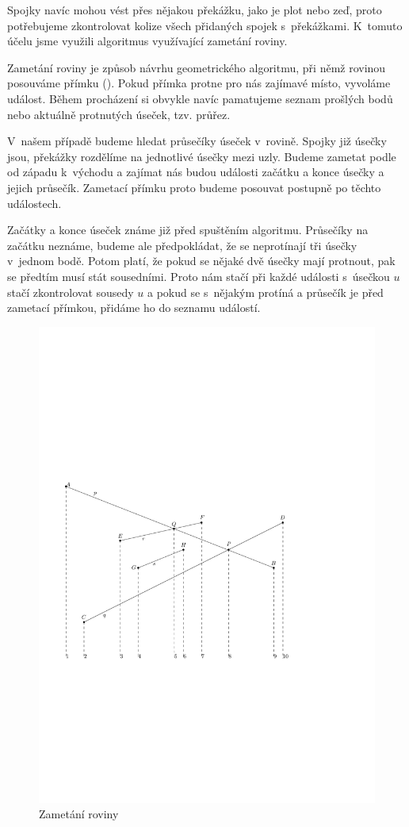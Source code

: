 Spojky navíc mohou vést přes nějakou překážku, jako je plot nebo zeď, proto
potřebujeme zkontrolovat kolize všech přidaných spojek s~překážkami. K~tomuto
účelu jsme využili algoritmus využívající zametání roviny.


{\tuc Zametání roviny} \cite{zametani} je způsob návrhu geometrického algoritmu,
při němž rovinou posouváme přímku (). Pokud přímka protne pro nás
zajímavé místo, vyvoláme událost. Během procházení si obvykle navíc pamatujeme
seznam prošlých bodů nebo aktuálně protnutých úseček, tzv. {\tuc průřez}.

V~našem případě budeme hledat průsečíky úseček v~rovině. Spojky již úsečky jsou,
překážky rozdělíme na jednotlivé úsečky mezi uzly. Budeme zametat podle od
západu k~východu a zajímat nás budou události začátku a konce úsečky a jejich
průsečík. Zametací přímku proto budeme posouvat postupně po těchto událostech.

Začátky a konce úseček známe již před spuštěním algoritmu. Průsečíky na začátku
neznáme, budeme ale předpokládat, že se neprotínají tři úsečky v~jednom bodě.
Potom platí, že pokud se nějaké dvě úsečky mají protnout, pak se předtím musí
stát sousedními. Proto nám stačí při každé události s~úsečkou $u$ stačí
zkontrolovat sousedy $u$ a pokud se s~nějakým protíná a průsečík je před
zametací přímkou, přidáme ho do seznamu událostí.

\begin{figure}[h]
	\centering
	\includegraphics{../img/zametani.pdf}
	\caption{Zametání roviny}
	\label{fig:zametani}
\end{figure}

